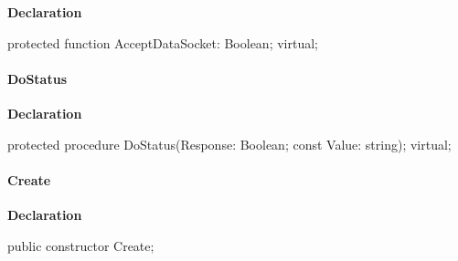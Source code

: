 \documentclass{report}
\newif\ifpdf
\begin{document}
\label{ftpsend.TFTPSend-AcceptDataSocket}
\begin{list}{}{
\setlength{\itemindent}{0cm}
\setlength{\listparindent}{0cm}
\setlength{\leftmargin}{\evensidemargin}
\addtolength{\leftmargin}{\tmplength}
\settowidth{\labelsep}{X}
\addtolength{\leftmargin}{\labelsep}
\setlength{\labelwidth}{\tmplength}
}
\item[\textbf{Declaration}\hfill]
\ifpdf
\begin{flushleft}
\fi
\begin{ttfamily}
protected function AcceptDataSocket: Boolean; virtual;\end{ttfamily}

\ifpdf
\end{flushleft}
\fi

\end{list}
\paragraph*{DoStatus}\hspace*{\fill}

\label{ftpsend.TFTPSend-DoStatus}
\begin{list}{}{
\setlength{\itemindent}{0cm}
\setlength{\listparindent}{0cm}
\setlength{\leftmargin}{\evensidemargin}
\addtolength{\leftmargin}{\tmplength}
\settowidth{\labelsep}{X}
\addtolength{\leftmargin}{\labelsep}
\setlength{\labelwidth}{\tmplength}
}
\item[\textbf{Declaration}\hfill]
\ifpdf
\begin{flushleft}
\fi
\begin{ttfamily}
protected procedure DoStatus(Response: Boolean; const Value: string); virtual;\end{ttfamily}

\ifpdf
\end{flushleft}
\fi

\end{list}
\paragraph*{Create}\hspace*{\fill}

\label{ftpsend.TFTPSend-Create}
\begin{list}{}{
\setlength{\itemindent}{0cm}
\setlength{\listparindent}{0cm}
\setlength{\leftmargin}{\evensidemargin}
\addtolength{\leftmargin}{\tmplength}
\settowidth{\labelsep}{X}
\addtolength{\leftmargin}{\labelsep}
\setlength{\labelwidth}{\tmplength}
}
\item[\textbf{Declaration}\hfill]
\ifpdf
\begin{flushleft}
\fi
\begin{ttfamily}
public constructor Create;\end{ttfamily}

\ifpdf
\end{flushleft}
\fi

\end{list}
\end{document}
